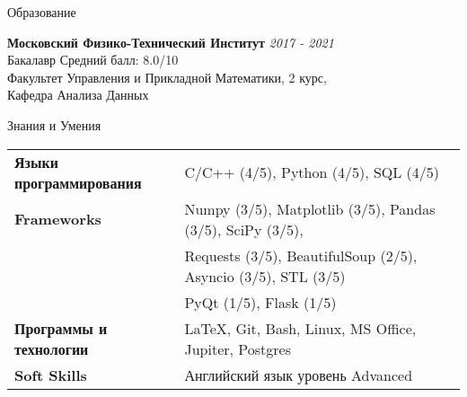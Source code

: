 \documentclass{resume} %
\begin{document}

\begin{rSection}{Образование}

{\bf Московский Физико-Технический Институт} \hfill {\em 2017 - 2021} 
\\ Бакалавр \hfill { Средний балл: 8.0/10}
\\ Факультет Управления и Прикладной Математики, 2 курс, \\Кафедра Анализа Данных


\end{rSection}

\begin{rSection}{Знания и Умения}

\begin{tabular}{ @{} >{\bfseries}l @{\hspace{6ex}} l }
Языки программирования &  C/C++ (4/5), Python (4/5),  SQL  (4/5) \\
Frameworks & Numpy (3/5), Matplotlib (3/5), Pandas (3/5), SciPy (3/5), \\ 
					& Requests (3/5), BeautifulSoup (2/5), Asyncio (3/5), STL (3/5) \\
					& PyQt (1/5), Flask (1/5)\\
Программы и технологии & LaTeX, Git, Bash, Linux, MS Office, Jupiter, Postgres \\
Soft Skills & Английский язык уровень Advanced
\end{tabular}

\end{rSection}


\end{document}
